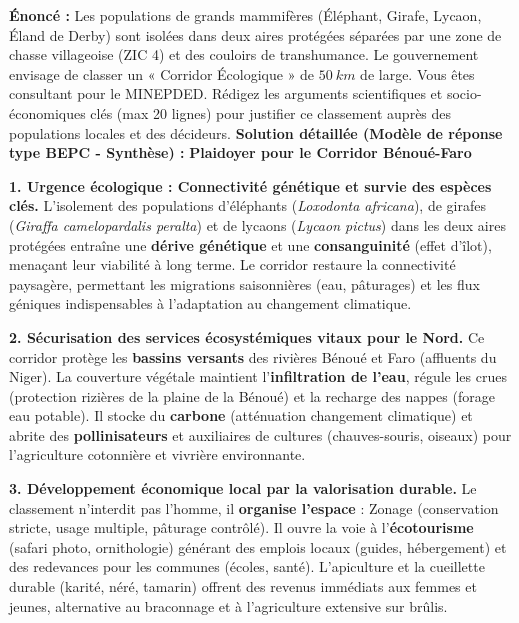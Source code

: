 \documentclass[11pt]{article}
\newcommand{\cle}[1]{{\popxbold\color{popdark}#1}}
\begin{document}
\begin{exoresolu}
    \textbf{Énoncé :} Les populations de grands mammifères (Éléphant, Girafe, Lycaon, Éland de Derby) sont isolées dans deux aires protégées séparées par une zone de chasse villageoise (ZIC 4) et des couloirs de transhumance. Le gouvernement envisage de classer un « Corridor Écologique » de $\SI{50}{km}$ de large. Vous êtes consultant pour le MINEPDED. Rédigez les arguments scientifiques et socio-économiques clés (max 20 lignes) pour justifier ce classement auprès des populations locales et des décideurs.
    \tcblower
    \textbf{Solution détaillée (Modèle de réponse type BEPC - Synthèse) :}
    \textbf{Plaidoyer pour le Corridor Bénoué-Faro}
    \par\medskip
    \textbf{1. Urgence écologique : Connectivité génétique et survie des espèces clés.}
    L'isolement des populations d'éléphants (\emph{Loxodonta africana}), de girafes (\emph{Giraffa camelopardalis peralta}) et de lycaons (\emph{Lycaon pictus}) dans les deux aires protégées entraîne une \textbf{dérive génétique} et une \textbf{consanguinité} (effet d'îlot), menaçant leur viabilité à long terme. Le corridor restaure la \cle{connectivité paysagère}, permettant les migrations saisonnières (eau, pâturages) et les flux géniques indispensables à l'adaptation au changement climatique.
    \par\medskip
    \textbf{2. Sécurisation des services écosystémiques vitaux pour le Nord.}
    Ce corridor protège les \textbf{bassins versants} des rivières Bénoué et Faro (affluents du Niger). La couverture végétale maintient l'\textbf{infiltration de l'eau}, régule les crues (protection rizières de la plaine de la Bénoué) et la recharge des nappes (forage eau potable). Il stocke du \textbf{carbone} (atténuation changement climatique) et abrite des \textbf{pollinisateurs} et auxiliaires de cultures (chauves-souris, oiseaux) pour l'agriculture cotonnière et vivrière environnante.
    \par\medskip
    \textbf{3. Développement économique local par la valorisation durable.}
    Le classement n'interdit pas l'homme, il \textbf{organise l'espace} : Zonage (conservation stricte, usage multiple, pâturage contrôlé). Il ouvre la voie à l'\textbf{écotourisme} (safari photo, ornithologie) générant des emplois locaux (guides, hébergement) et des redevances pour les communes (écoles, santé). L'apiculture et la cueillette durable (karité, néré, tamarin) offrent des revenus immédiats aux femmes et jeunes, alternative au braconnage et à l'agriculture extensive sur brûlis.

\end{exoresolu}
\end{document}
